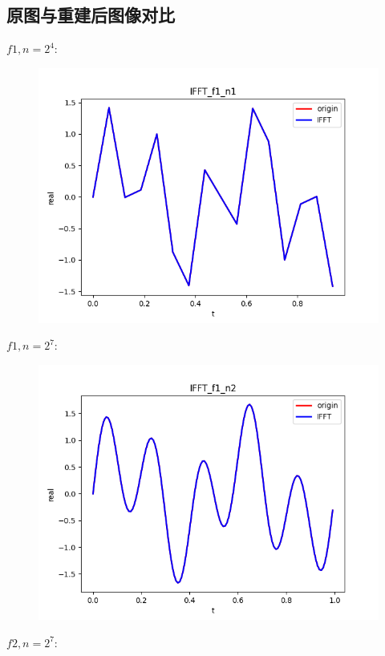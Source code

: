 \documentclass[12pt,a4paper,oneside]{article}
\begin{document}
\subsection{原图与重建后图像对比}
$f1, n = 2^4$:
\begin{figure}[H]
    \centering
    \includegraphics[scale = 0.85]{../res/figs/IFFT_f1_n1.png}
\end{figure}
$f1, n = 2^7$:
\begin{figure}[H]
    \centering
    \includegraphics[scale = 0.85]{../res/figs/IFFT_f1_n2.png}
\end{figure}
$f2, n = 2^7$:
\end{document}
